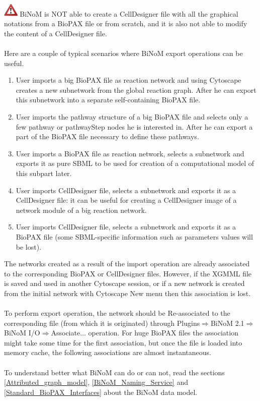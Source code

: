 \includegraphics[width=20pt,height=20pt]{graphics/warning} BiNoM is NOT able to
create a CellDesigner file with all the graphical notations from a BioPAX file or from
scratch, and it is also not able to modify the content of a CellDesigner file.\\\\

Here are a couple of typical scenarios where BiNoM export operations can be useful.
\begin{enumerate}
\item User imports a big BioPAX file as reaction network and using Cytoscape creates a new subnetwork from the global reaction graph. After he can export this subnetwork into a separate self-containing BioPAX file.
\item User imports the pathway structure of a big BioPAX file and selects only a few pathway or pathwayStep nodes he is interested in. After he can export a part of the BioPAX file necessary to define these pathways.
\item User imports a BioPAX file as reaction network, selects a subnetwork and exports it as pure SBML to be used for creation of a computational model of this subpart later.
\item User imports CellDesigner file, selects a subnetwork and exports it as a CellDesigner file: it can be useful for creating a CellDesigner image of a network module of a big reaction network.
\item User imports CellDesigner file, selects a subnetwork and exports it as a BioPAX file (some SBML-specific information such as parameters values will be lost).
\end{enumerate}
The networks created as a result of the import operation are already associated to the corresponding BioPAX or CellDesigner files. However, if the XGMML file is saved and used in another Cytoscape session, or if a new network is created from the initial network with Cytoscape New menu then this association is lost.\\\\
To perform export operation, the network should be Re-associated to the corresponding file (from which it is originated) through Plugins$\Rightarrow$BiNoM 2.1$\Rightarrow$BiNoM I/O$\Rightarrow$Associate$\ldots$ operation. For huge BioPAX files the association might take some time for the first association, but once the file is loaded into memory cache, the following associations are almost instantaneous.\\\\
To understand better what BiNoM can do or can not, read the sections \ref{Attributed_graph_model}, \ref{BiNoM_Naming_Service} and \ref{Standard_BioPAX_Interfaces} about the BiNoM data model.




